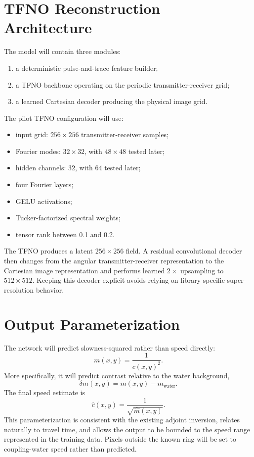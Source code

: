 \documentclass[11pt]{article}
\begin{document}
\section{TFNO Reconstruction Architecture}

The model will contain three modules:
\begin{enumerate}
  \item a deterministic pulse-and-trace feature builder;
  \item a TFNO backbone operating on the periodic transmitter-receiver grid;
  \item a learned Cartesian decoder producing the physical image grid.
\end{enumerate}

The pilot TFNO configuration will use:
\begin{itemize}
  \item input grid: $256\times256$ transmitter-receiver samples;
  \item Fourier modes: $32\times32$, with $48\times48$ tested later;
  \item hidden channels: 32, with 64 tested later;
  \item four Fourier layers;
  \item GELU activations;
  \item Tucker-factorized spectral weights;
  \item tensor rank between 0.1 and 0.2.
\end{itemize}

The TFNO produces a latent $256\times256$ field. A residual convolutional
decoder then changes from the angular transmitter-receiver representation to
the Cartesian image representation and performs learned $2\times$ upsampling
to $512\times512$. Keeping this decoder explicit avoids relying on
library-specific super-resolution behavior.

\section{Output Parameterization}

The network will predict slowness-squared rather than speed directly:
\begin{equation}
  m(x,y)=\frac{1}{c(x,y)^2}.
\end{equation}
More specifically, it will predict contrast relative to the water background,
\begin{equation}
  \delta m(x,y)=m(x,y)-m_{\mathrm{water}}.
\end{equation}
The final speed estimate is
\begin{equation}
  \widehat{c}(x,y)=\frac{1}{\sqrt{\widehat{m}(x,y)}}.
\end{equation}
This parameterization is consistent with the existing adjoint inversion,
relates naturally to travel time, and allows the output to be bounded to the
speed range represented in the training data. Pixels outside the known ring
will be set to coupling-water speed rather than predicted.
\end{document}
